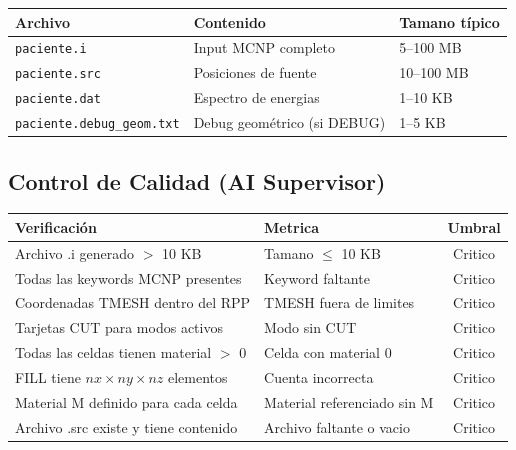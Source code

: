 \documentclass[12pt,a4paper]{article}
\begin{document}
\begin{center}
\begin{tabular}{lll}
\toprule
\textbf{Archivo} & \textbf{Contenido} & \textbf{Tamano típico} \\
\midrule
\texttt{paciente.i} & Input MCNP completo & 5--100 MB \\
\texttt{paciente.src} & Posiciones de fuente & 10--100 MB \\
\texttt{paciente.dat} & Espectro de energias & 1--10 KB \\
\texttt{paciente.debug\_geom.txt} & Debug geométrico (si DEBUG) & 1--5 KB \\
\bottomrule
\end{tabular}
\end{center}


\begin{tcolorbox}[aiSupervisor]

\begin{tcolorbox}[aiSupervisor]
\subsection*{Control de Calidad (AI Supervisor)}

\begin{table}[H]
\centering
\begin{tabular}{llc}
\toprule
\textbf{Verificación} & \textbf{Metrica} & \textbf{Umbral} \\
\midrule
Archivo .i generado $>$ 10 KB & Tamano $\leq$ 10 KB & Critico \\
Todas las keywords MCNP presentes & Keyword faltante & Critico \\
Coordenadas TMESH dentro del RPP & TMESH fuera de limites & Critico \\
Tarjetas CUT para modos activos & Modo sin CUT & Critico \\
Todas las celdas tienen material $>$ 0 & Celda con material 0 & Critico \\
FILL tiene $nx \times ny \times nz$ elementos & Cuenta incorrecta & Critico \\
Material M definido para cada celda & Material referenciado sin M & Critico \\
Archivo .src existe y tiene contenido & Archivo faltante o vacio & Critico \\
\bottomrule
\end{tabular}
\end{table}

\newpage


\end{tcolorbox}
\end{tcolorbox}
\end{document}
